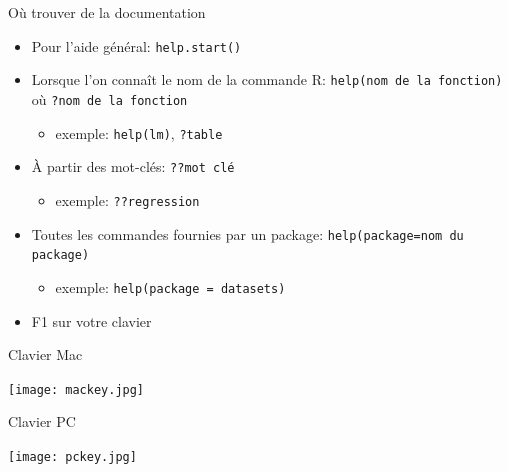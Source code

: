 \documentclass[11pt]{beamer}\usepackage[]{graphicx}\usepackage[]{color}
\newcommand{\code}[1]{\texttt{#1}}
\begin{document}
\begin{frame}{O\`{u} trouver de la documentation}
\begin{itemize}
  \setlength\itemsep{1.5em}
\item Pour l'aide g\'{e}n\'{e}ral: \texttt{help.start()} 
\item Lorsque l'on conna\^{i}t le nom de la commande R: \mbox{\texttt{help(nom de la fonction)}} o\`{u} \mbox{\texttt{?nom de la fonction}}
\begin{itemize}
\item exemple: \code{help(lm)}, \code{?table}
\end{itemize}
\item \`{A} partir des mot-cl\'{e}s: \texttt{??mot cl\'{e}}
\begin{itemize}
\item exemple: \code{??regression}
\end{itemize}
\item Toutes les commandes fournies par un package: \code{help(package=nom du package)}
\begin{itemize}
\item exemple: \code{help(package = datasets)}
\end{itemize}
\item F1 sur votre clavier 
\end{itemize}
\end{frame}


\begin{frame}{Clavier Mac}

\vspace{0.1in}

\begin{center}
\texttt{[image: mackey.jpg]}
\end{center}

\end{frame}



\begin{frame}{Clavier PC}

\vspace{0.1in}

\begin{center}
\texttt{[image: pckey.jpg]}
\end{center}

\end{frame}



\end{document}
